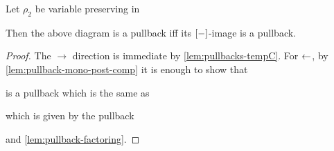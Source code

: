 \begin{lemma}\label{lem:pullback-vpres}
    Let $\rho_2$ be variable preserving in 
    \begin{center}
    \end{center}
    Then the above diagram is a pullback iff its $[-]$-image is a pullback.
\end{lemma}
\begin{proof}
    The $\to$ direction is immediate by \cref{lem:pullbacks-tempC}.
    For $\leftarrow$, by \cref{lem:pullback-mono-post-comp} it is enough to show that
    is a pullback which is the same as
    which is given by the pullback
     and \cref{lem:pullback-factoring}.
\end{proof}

